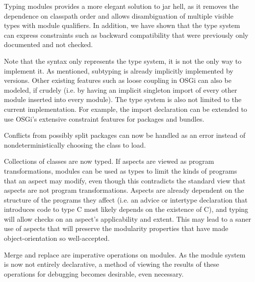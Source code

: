 Typing modules provides a more elegant solution to jar hell, as it removes the dependence
on classpath order and allows disambiguation of multiple visible types with
module qualifiers. In addition, we have shown that the type system can express
constraints such as backward compatibility that were previously only documented 
and not checked.

Note that the syntax only represents the type system, it is not the only way
to implement it. As mentioned, subtyping is already implicitly implemented
by versions. Other existing features such as loose coupling in OSGi can
also be modeled, if crudely (i.e. by having an implicit singleton import of every other
module inserted into every module). The type system is also not limited to
the current implementation. For example, the import declaration can be 
extended to use OSGi's extensive constraint features for packages and bundles.

Conflicts from possibly split packages can now be handled as an error instead
of nondeterministically choosing the class to load.

Collections of classes are now typed. If aspects are viewed as program transformations,
modules can be used as types to limit the kinds of programs that an aspect may modify, even though 
this contradicts the standard view that aspects are not program transformations. 
Aspects are already dependent on the structure of the programs they affect (i.e. 
an advice or intertype declaration that introduces code to type C most likely
depends on the existence of C), and typing will allow checks on an aspect's applicability
and extent.
This may lead to a saner use of aspects that will preserve the modularity properties
that have made object-orientation so well-accepted.

Merge and replace are imperative operations on modules. As the module system
is now not entirely declarative, a method of viewing the results of these operations
for debugging becomes desirable, even necessary.
